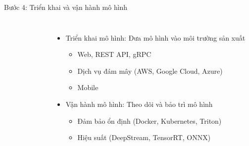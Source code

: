 \documentclass{beamer}
\begin{document}
\begin{frame}{Bước 4: Triển khai và vận hành mô hình}
    \begin{columns}
        \begin{figure}
            \centering
        \end{figure}
        \begin{itemize}
            \item Triển khai mô hình: Đưa mô hình vào môi trường sản xuất
            \begin{itemize}
                \item Web, REST API, gRPC
                \item Dịch vụ đám mây (AWS, Google Cloud, Azure)
                \item Mobile
            \end{itemize}
            \item Vận hành mô hình: Theo dõi và bảo trì mô hình
            \begin{itemize}
                \item Đảm bảo ổn định (Docker, Kubernetes, Triton)
                \item Hiệu suất (DeepStream, TensorRT, ONNX)
            \end{itemize}
        \end{itemize}
    \end{columns}
\end{frame}
\end{document}
